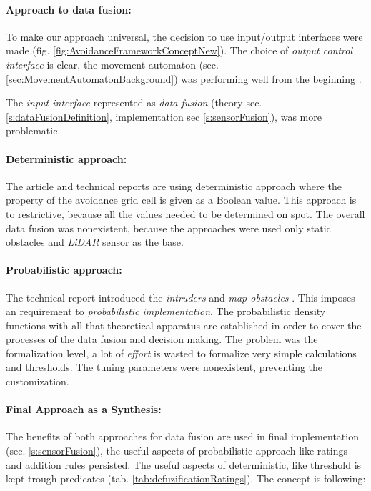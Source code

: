 \paragraph{Approach to data fusion:} To make our approach universal, the decision to use input/output interfaces were made (fig. \ref{fig:AvoidanceFrameworkConceptNew}). The choice of \emph{output control interface} is clear, the movement automaton (sec. \ref{sec:MovementAutomatonBackground}) was performing well from the beginning \cite{gomola2017optimal,gomola2017mpc}.

The \emph{input interface} represented as \emph{data fusion} (theory sec. \ref{s:dataFusionDefinition}, implementation sec \ref{s:sensorFusion}), was more problematic.

\paragraph{Deterministic approach:} The article \cite{gomola2017obstacle} and technical reports \cite{gomola2017mpc,gomola2017optimal} are using deterministic approach where the property of the avoidance grid cell is given as a Boolean value. This approach is to restrictive, because all the values needed to be determined on spot. The overall data fusion was nonexistent, because the approaches were used only static obstacles and \emph{LiDAR} sensor as the base. 

\paragraph{Probabilistic approach:} The technical report \cite{gomola2017probabilistic} introduced the \emph{intruders} and \emph{map obstacles} \cite{cernamaria2018}. This imposes an requirement to \emph{probabilistic implementation}. The probabilistic density functions with all that theoretical apparatus are established in order to cover the processes of the data fusion and decision making. The problem was the formalization level, a lot of \emph{effort} is wasted to formalize very simple calculations and thresholds. The tuning parameters were nonexistent, preventing the customization.

\paragraph{Final Approach as a Synthesis:} The benefits of both approaches for data fusion are used in final implementation (sec. \ref{s:sensorFusion}), the useful aspects of probabilistic approach like ratings and addition rules persisted. The useful aspects of deterministic, like threshold is kept trough predicates (tab. \ref{tab:defuzificationRatings}). The concept is following:


